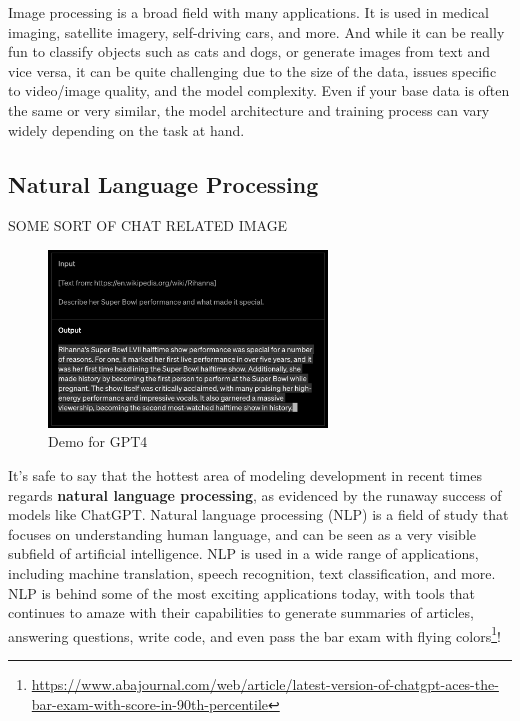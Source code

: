 \documentclass[
  letterpaper,
]{krantz}
\DeclareRobustCommand{\href}[2]{#2\footnote{\url{#1}}}
\begin{document}
Image processing is a broad field with many applications. It is used in
medical imaging, satellite imagery, self-driving cars, and more. And
while it can be really fun to classify objects such as cats and dogs, or
generate images from text and vice versa, it can be quite challenging
due to the size of the data, issues specific to video/image quality, and
the model complexity. Even if your base data is often the same or very
similar, the model architecture and training process can vary widely
depending on the task at hand.

\subsection{Natural Language
Processing}\label{natural-language-processing}

SOME SORT OF CHAT RELATED IMAGE

\begin{figure}

{\centering \includegraphics[width=0.66\textwidth,height=\textheight]{img/gpt4.png}

}

\caption{\label{fig-gpt4}Demo for GPT4}

\end{figure}

It's safe to say that the hottest area of modeling development in recent
times regards \textbf{natural language processing}, as evidenced by the
runaway success of models like ChatGPT. Natural language processing
(NLP) is a field of study that focuses on understanding human language,
and can be seen as a very visible subfield of artificial intelligence.
NLP is used in a wide range of applications, including machine
translation, speech recognition, text classification, and more. NLP is
behind some of the most exciting applications today, with tools that
continues to amaze with their capabilities to generate summaries of
articles, answering questions, write code, and even
\href{https://www.abajournal.com/web/article/latest-version-of-chatgpt-aces-the-bar-exam-with-score-in-90th-percentile}{pass
the bar exam with flying colors}!
\end{document}

